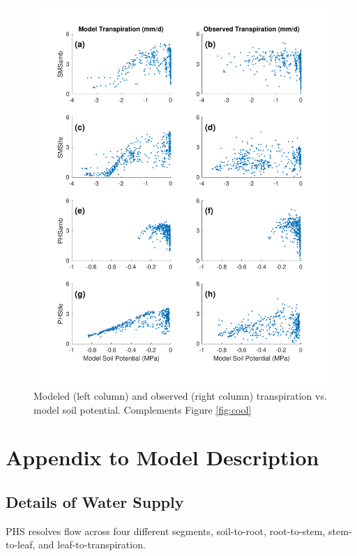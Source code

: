 \documentclass[draft,linenumbers]{agujournal}
\begin{document}
     \begin{figure}[h]
     \centering
     \includegraphics[width=30pc]{../figs3/suppcool.pdf}
     \caption{Modeled (left column) and observed (right column) transpiration  vs. model soil potential.
     Complements Figure \ref{fig:cool}}
     \label{supp:cool}
  \end{figure}
          \clearpage
          



\section{Appendix to Model Description}

\subsection{Details of Water Supply}

PHS resolves flow across four different segments, soil-to-root, root-to-stem, stem-to-leaf, and leaf-to-transpiration.
\end{document}
